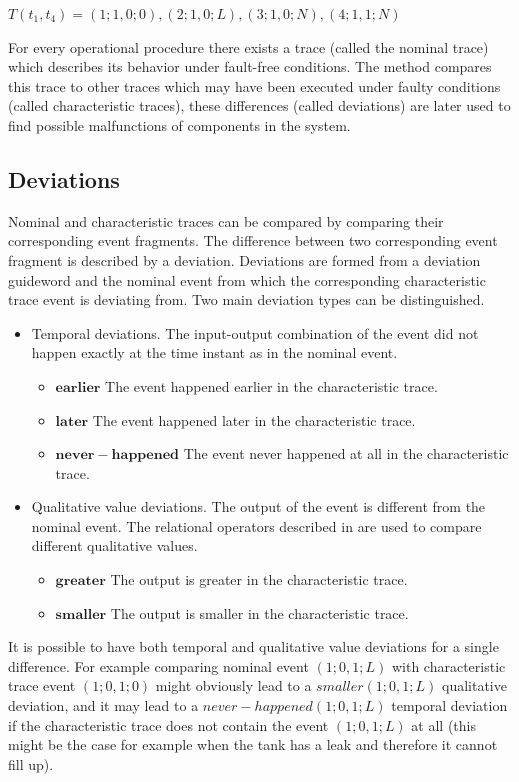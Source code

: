 \documentclass[conference]{IEEEtran}
\begin{document}
$T(t_1,t_4)=(1;1,0;0),(2;1,0;L),(3;1,0;N),(4;1,1;N)$

For every operational procedure there exists a trace (called the nominal trace) which describes its behavior under fault-free conditions. The method compares this trace to other traces which may have been executed under faulty conditions (called characteristic traces), these differences (called deviations) are later used to find possible malfunctions of components in the system.

\subsection{Deviations}
\label{sec:deviations}
Nominal and characteristic traces can be compared by comparing their corresponding event fragments. The difference between two corresponding event fragment is described by a deviation. Deviations are formed from a deviation guideword and the nominal event from which the corresponding characteristic trace event is deviating from. Two main deviation types can be distinguished.

\begin{itemize}
\item Temporal deviations. The input-output combination of the event did not happen exactly at the time instant as in the nominal event. 
	\begin{itemize}
	  \item $\mathbf{earlier}$ The event happened earlier in the characteristic trace.
	  \item $\mathbf{later}$ The event happened later in the characteristic trace.
	  \item $\mathbf{never-happened}$ The event never happened at all in the characteristic trace.
	\end{itemize}
\item Qualitative value deviations. The output of the event is different from the nominal event. The relational operators described in \cite{KES2010} are used to compare different qualitative values.
	\begin{itemize}
	  \item $\mathbf{greater}$ The output is greater in the characteristic trace.
	  \item $\mathbf{smaller}$ The output is smaller in the characteristic trace.
	\end{itemize}
\end{itemize}

It is possible to have both temporal and qualitative value deviations for a single difference. For example comparing nominal event $(1;0,1;L)$ with characteristic trace event $(1;0,1;0)$ might obviously lead to a $smaller(1;0,1;L)$ qualitative deviation, and it may lead to a $never-happened(1;0,1;L)$ temporal deviation if the characteristic trace does not contain the event $(1;0,1;L)$ at all (this might be the case for example when the tank has a leak and therefore it cannot fill up).
\end{document}
